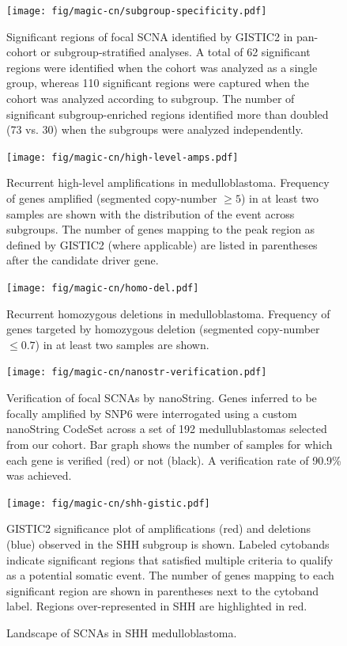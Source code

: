 \documentclass[11pt,letterpaper]{article}
\theoremstyle{definition}
\begin{document}
\clearpage

\begin{figure}
	\centering
	\texttt{[image: fig/magic-cn/subgroup-specificity.pdf]}
	\caption{Significant regions of focal SCNA identified by GISTIC2 in pan-cohort or subgroup-stratified analyses.
	A total of 62 significant regions were identified when the cohort was analyzed as a single group, whereas 110 significant regions were captured when the cohort was analyzed according to subgroup. The number of significant subgroup-enriched regions identified more than doubled (73 vs. 30) when the subgroups were analyzed independently.}
	\label{fig:subgroup-specificity}
\end{figure}

\begin{figure}
	\centering
	\texttt{[image: fig/magic-cn/high-level-amps.pdf]}
	\caption{Recurrent high-level amplifications in medulloblastoma.
	Frequency of genes amplified (segmented copy-number $\geq 5$) in at least two samples are shown with the distribution of the event across subgroups. The number of genes mapping to the peak region as defined by GISTIC2 (where applicable) are listed in parentheses after the candidate driver gene.}
	\label{fig:high-level-amps}
\end{figure}

\begin{figure}
	\centering
	\texttt{[image: fig/magic-cn/homo-del.pdf]}
	\caption{Recurrent homozygous deletions in medulloblastoma. Frequency of genes targeted by homozygous deletion (segmented copy-number $\leq 0.7$) in at least two samples are shown.}
	\label{fig:homo-del}
\end{figure}

\begin{figure}
	\centering
	\texttt{[image: fig/magic-cn/nanostr-verification.pdf]}
	\caption{Verification of focal SCNAs by nanoString.
	Genes inferred to be focally amplified by SNP6 were interrogated using a custom nanoString CodeSet across a set of 192 medullublastomas selected from our cohort. Bar graph shows the number of samples for which each gene is verified (red) or not (black). A verification rate of 90.9\% was achieved.}
	\label{fig:nanostr-verification}
\end{figure}

\clearpage

\begin{figure}[h]
	\begin{center}
		\texttt{[image: fig/magic-cn/shh-gistic.pdf]}
	\end{center}
	\caption{Landscape of SCNAs in SHH medulloblastoma.}
	GISTIC2 significance plot of amplifications (red) and deletions (blue) observed in the SHH subgroup is shown.
	Labeled cytobands indicate significant regions that satisfied multiple criteria to qualify as a potential somatic event. The number of genes mapping to each significant region are shown in parentheses next to the cytoband label.  Regions over-represented in SHH are highlighted in red.
	\label{fig:shh-gistic}
\end{figure}
\end{document}
